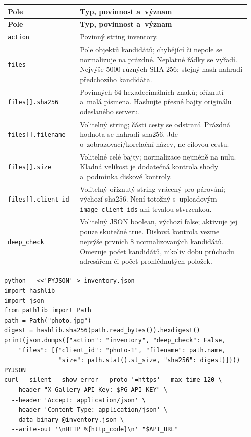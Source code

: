 \documentclass[11pt,a4paper]{article}
\newcommand{\codeword}[1]{\nolinkurl{#1}}
\begin{document}
\begin{longtable}{@{}>{\RaggedRight\arraybackslash}p{0.28\linewidth}>{\RaggedRight\arraybackslash}p{0.67\linewidth}@{}}
\toprule
\textbf{Pole} & \textbf{Typ, povinnost a~význam} \\
\midrule
\endfirsthead
\toprule
\textbf{Pole} & \textbf{Typ, povinnost a~význam} \\
\midrule
\endhead
\bottomrule
\endfoot
\codeword{action} & Povinný string inventory. \\
\codeword{files} & Pole objektů kandidátů; chybějící či nepole se normalizuje na prázdné.
Neplatné řádky se vyřadí. Nejvýše 5000 různých SHA-256; stejný hash nahradí předchozího
kandidáta. \\
\codeword{files[].sha256} & Povinných 64 hexadecimálních znaků; oříznutí a~malá písmena.
Hashujte přesné bajty originálu odeslaného serveru. \\
\codeword{files[].filename} & Volitelný string; části cesty se odstraní. Prázdná hodnota se
nahradí sha256. Jde o~zobrazovací/korelační název, ne cílovou cestu. \\
\codeword{files[].size} & Volitelné celé bajty; normalizace nejméně na nulu. Kladná velikost
je dodatečná kontrola shody a~podmínka diskové kontroly. \\
\codeword{files[].client_id} & Volitelný oříznutý string vrácený pro párování; výchozí
sha256. Není totožný s~uploadovým \codeword{image_client_ids} ani trvalou stvrzenkou. \\
\codeword{deep_check} & Volitelný JSON boolean, výchozí false; aktivuje jej pouze skutečné
true. Disková kontrola vezme nejvýše prvních 8 normalizovaných kandidátů. Omezuje počet
kandidátů, nikoliv dobu průchodu adresářem či počet prohlédnutých položek. \\
\end{longtable}

\begin{lstlisting}[language={}]
python - <<'PYJSON' > inventory.json
import hashlib
import json
from pathlib import Path
path = Path("photo.jpg")
digest = hashlib.sha256(path.read_bytes()).hexdigest()
print(json.dumps({"action": "inventory", "deep_check": False,
    "files": [{"client_id": "photo-1", "filename": path.name,
               "size": path.stat().st_size, "sha256": digest}]}))
PYJSON
curl --silent --show-error --proto '=https' --max-time 120 \
  --header "X-Gallery-API-Key: $PG_API_KEY" \
  --header 'Accept: application/json' \
  --header 'Content-Type: application/json' \
  --data-binary @inventory.json \
  --write-out '\nHTTP %{http_code}\n' "$API_URL"
\end{lstlisting}
\end{document}
